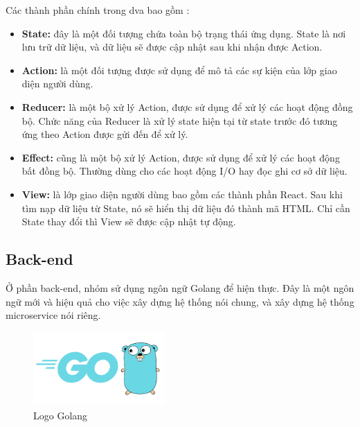             Các thành phần chính trong dva bao gồm \cite{technologyDvaAdvance}: 
            \begin{itemize}
                \item \textbf{State:} đây là một đối tượng chứa toàn bộ trạng thái ứng dụng. State là nơi lưu trữ dữ liệu, và dữ liệu sẽ được cập nhật sau khi nhận được Action.
                \item \textbf{Action:} là một đối tượng được sử dụng để mô tả các sự kiện của lớp giao diện người dùng.
                \item \textbf{Reducer:} là một bộ xử lý Action, được sử dụng để xử lý các hoạt động đồng bộ. Chức năng của Reducer là xử lý state hiện tại từ state trước đó tương ứng theo Action được gửi đến để xử lý.
                \item \textbf{Effect:} cũng là một bộ xử lý Action, được sử dụng để xử lý các hoạt động bất đồng bộ. Thường dùng cho các hoạt động I/O hay đọc ghi cơ sở dữ liệu.
                \item \textbf{View:} là lớp giao diện người dùng bao gồm các thành phần React. Sau khi tìm nạp dữ liệu từ State, nó sẽ hiển thị dữ liệu đó thành mã HTML. Chỉ cần State thay đổi thì View sẽ được cập nhật tự động.
            \end{itemize}

    
    \subsection{Back-end}
\par Ở phần back-end, nhóm sử dụng ngôn ngữ Golang để hiện thực. Đây là một ngôn ngữ mới và hiệu quả cho việc xây dựng hệ thống nói chung, và xây dựng hệ thống microservice nói riêng.

\begin{figure}[!htp]
    \begin{center}
    \includegraphics[width=5cm]{img/Technology/Golang.png}
    \end{center}
    \caption{Logo Golang}
\end{figure}

